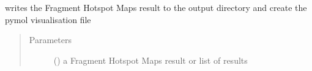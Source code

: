 \documentclass[letterpaper,10pt,english]{sphinxmanual}
\begin{document}
\begin{fulllineitems}
\begin{fulllineitems}
\label{\detokenize{hs_io_api:hotspots.hs_io.HotspotWriter.write}}
writes the Fragment Hotspot Maps result to the output directory and create the pymol visualisation file
\begin{quote}\begin{description}
\item[{Parameters}] \leavevmode
{} () \textendash{} a Fragment Hotspot Maps result or list of results

\end{description}\end{quote}

\begin{sphinxVerbatim}[commandchars=\\\{\}]
   
   
\end{sphinxVerbatim}

\begin{sphinxVerbatim}[commandchars=\\\{\}]
  
  
  
   
    
\end{sphinxVerbatim}

\end{fulllineitems}


\end{fulllineitems}
\end{document}
